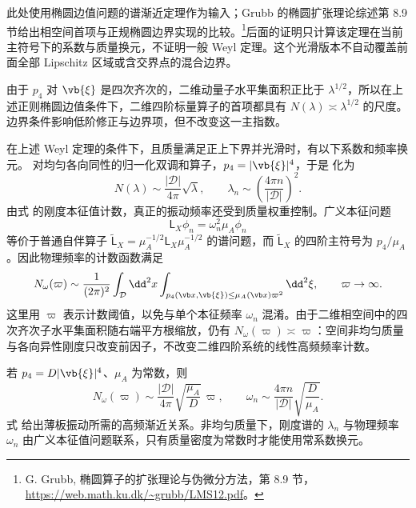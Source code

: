 此处使用椭圆边值问题的谱渐近定理作为输入；Grubb 的椭圆扩张理论综述第 8.9 节给出相空间首项与正规椭圆边界实现的比较。\footnote{G. Grubb, 椭圆算子的扩张理论与伪微分方法，第 8.9 节，\url{https://web.math.ku.dk/~grubb/LMS12.pdf}。}后面的证明只计算该定理在当前主符号下的系数与质量换元，不证明一般 Weyl 定理。这个光滑版本不自动覆盖前面全部 Lipschitz 区域或含交界点的混合边界。

由于 \(p_4\) 对 \(\vb{\xi}\) 是四次齐次的，二维动量子水平集面积正比于 \(\lambda^{1/2}\)，所以在上述正则椭圆边值条件下，二维四阶标量算子的首项都具有 \(N(\lambda)\asymp\lambda^{1/2}\) 的尺度。边界条件影响低阶修正与边界项，但不改变这一主指数。

\begin{proposition}[各向同性系数与质量加权的谱计数]
在上述 Weyl 定理的条件下，且质量满足正上下界并光滑时，有以下系数和频率换元。
对均匀各向同性的归一化双调和算子，\(p_4=|\vb{\xi}|^4\)，于是 化为
\begin{equation}
 N(\lambda)
 \sim\frac{|\mathcal D|}{4\pi}\sqrt\lambda,
 \qquad
 \lambda_n\sim\left(\frac{4\pi n}{|\mathcal D|}\right)^2.
 \label{eq:phys-cont-weyl-counting}
\end{equation}
由式  的刚度本征值计数，真正的振动频率还受到质量权重控制。广义本征问题
\[
 \mathsf L_X\phi_n=\omega_n^2\mu_A\phi_n
\]
等价于普通自伴算子 \(\widetilde{\mathsf L}_X=\mu_A^{-1/2}\mathsf L_X\mu_A^{-1/2}\) 的谱问题，而 \(\widetilde{\mathsf L}_X\) 的四阶主符号为 \(p_4/\mu_A\)。因此物理频率的计数函数满足
\begin{equation}
 N_\omega(\varpi)
 \sim\frac{1}{(2\pi)^2}
 \int_\mathcal D\dd^2x
 \int_{p_4(\vb x,\vb{\xi})\le\mu_A(\vb x)\varpi^2}
 \dd^2\xi,
 \qquad \varpi\to\infty.
 \label{eq:phys-cont-weighted-frequency-weyl}
\end{equation}
这里用 \(\varpi\) 表示计数阈值，以免与单个本征频率 \(\omega_n\) 混淆。由于二维相空间中的四次齐次子水平集面积随右端平方根缩放，仍有 \(N_\omega(\varpi)\asymp\varpi\)：空间非均匀质量与各向异性刚度只改变前因子，不改变二维四阶系统的线性高频频率计数。

若 \(p_4=D|\vb{\xi}|^4\)、\(\mu_A\) 为常数，则
\begin{equation}
 N_\omega(\varpi)
 \sim\frac{|\mathcal D|}{4\pi}
 \sqrt{\frac{\mu_A}{D}}\,\varpi,
 \qquad
 \omega_n\sim\frac{4\pi n}{|\mathcal D|}
 \sqrt{\frac{D}{\mu_A}}.
 \label{eq:phys-cont-isotropic-frequency-weyl}
\end{equation}
式  给出薄板振动所需的高频渐近关系。非均匀质量下，刚度谱的 \(\lambda_n\) 与物理频率 \(\omega_n\) 由广义本征值问题联系，只有质量密度为常数时才能使用常系数换元。

\end{proposition}

